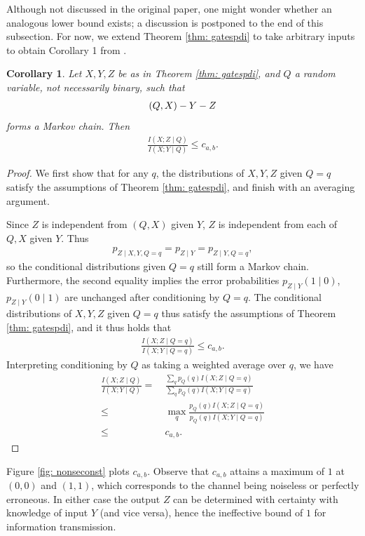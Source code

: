 \documentclass[12pt,reqno]{amsart}
\theoremstyle{plain} %
\newtheorem{cor}[theorem]{Corollary}
\theoremstyle{remark}
\theoremstyle{definition}
\begin{document}
Although not discussed in the original paper, one might wonder whether an analogous lower bound exists; a discussion is postponed to the end of this subsection. For now, we extend Theorem \ref{thm: gatespdi} to take arbitrary inputs to obtain Corollary 1 from \cite{ES}.
\begin{cor}\label{cor: conditioned}
    Let $X,Y,Z$ be as in Theorem \ref{thm: gatespdi}, and $Q$ a random variable, not necessarily binary, such that
    \begin{align}
        (Q,X)\--Y\--Z
    \end{align}
    forms a Markov chain. Then
    \begin{align}
        \frac{I(X;Z\mid Q)}{I(X;Y\mid Q)}\le c_{a,b}.
    \end{align}
\end{cor}
\begin{proof}
    We first show that for any $q$, the distributions of $X,Y,Z$ given $Q=q$ satisfy the assumptions of Theorem \ref{thm: gatespdi}, and finish with an averaging argument.

    Since $Z$ is independent from $(Q,X)$ given $Y$, $Z$ is independent from each of $Q,X$ given $Y$. Thus
    \begin{align}
        p_{Z\mid X,Y,Q=q}=p_{Z\mid Y}=p_{Z\mid Y,Q=q},
    \end{align}
    so the conditional distributions given $Q=q$ still form a Markov chain. Furthermore, the second equality implies the error probabilities $p_{Z\mid Y}(1\mid 0)$, $p_{Z\mid Y}(0\mid 1)$ are unchanged after conditioning by $Q=q$. The conditional distributions of $X,Y,Z$ given $Q=q$ thus satisfy the assumptions of Theorem \ref{thm: gatespdi}, and it thus holds that
    \begin{align}
        \frac{I(X;Z\mid Q=q)}{I(X;Y\mid Q=q)}\le c_{a,b}.
    \end{align}
    Interpreting conditioning by $Q$ as taking a weighted average over $q$, we have
    \begin{align}
        \frac{I(X;Z\mid Q)}{I(X;Y\mid Q)}=&\ \frac{\sum_q p_Q(q)I(X;Z\mid Q=q)}{\sum_q p_Q(q)I(X;Y\mid Q=q)}\\
        \le&\ \max_q \frac{p_Q(q)I(X;Z\mid Q=q)}{p_Q(q)I(X;Y\mid Q=q)}\\
        \le&\ c_{a,b}.
    \end{align}
\end{proof}

Figure \ref{fig: nonseconst} plots $c_{a,b}$. Observe that $c_{a,b}$ attains a maximum of $1$ at $(0,0)$ and $(1,1)$, which corresponds to the channel being noiseless or perfectly erroneous. In either case the output $Z$ can be determined with certainty with knowledge of input $Y$ (and vice versa), hence the ineffective bound of $1$ for information transmission.
\end{document}
